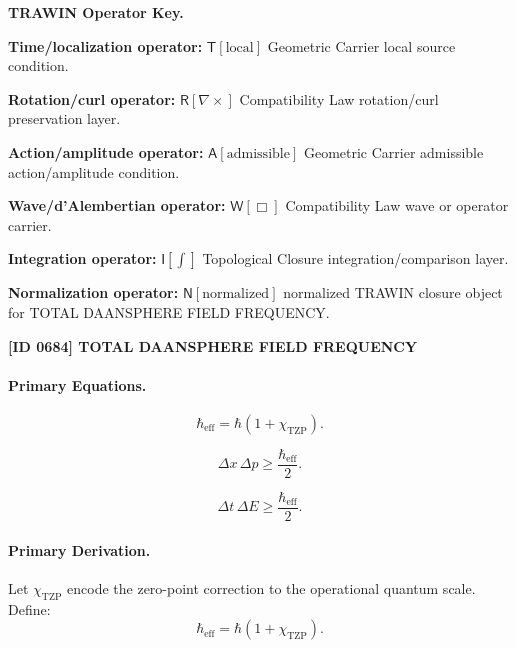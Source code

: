 \par\vspace{0.45\baselineskip}
\noindent\begin{minipage}[t]{\linewidth}
\begingroup
\small
\raggedright
\textbf{TRAWIN Operator Key.}\par
\noindent\textbf{Time/localization operator:} $\mathsf{T}\!\left[\mathrm{local}\right]$ Geometric Carrier local source condition.\par
\noindent\textbf{Rotation/curl operator:} $\mathsf{R}\!\left[\nabla\times\right]$ Compatibility Law rotation/curl preservation layer.\par
\noindent\textbf{Action/amplitude operator:} $\mathsf{A}\!\left[\mathrm{admissible}\right]$ Geometric Carrier admissible action/amplitude condition.\par
\noindent\textbf{Wave/d'Alembertian operator:} $\mathsf{W}\!\left[\Box\right]$ Compatibility Law wave or operator carrier.\par
\noindent\textbf{Integration operator:} $\mathsf{I}\!\left[\int\right]$ Topological Closure integration/comparison layer.\par
\noindent\textbf{Normalization operator:} $\mathsf{N}\!\left[\mathrm{normalized}\right]$ normalized TRAWIN closure object for TOTAL DAANSPHERE FIELD FREQUENCY.\par
\endgroup
\end{minipage}

\clearpage
\noindent\textbf{[ID 0684] TOTAL DAANSPHERE FIELD FREQUENCY}\par
\vspace{0.35em}
\paragraph{Primary Equations.}
\begin{equation}
\hbar_{\mathrm{eff}}
=
\hbar(1+\chi_{\mathrm{TZP}}).
\end{equation}

\begin{equation}
\Delta x\,\Delta p
\geq
\frac{\hbar_{\mathrm{eff}}}{2}.
\end{equation}

\begin{equation}
\Delta t\,\Delta E
\geq
\frac{\hbar_{\mathrm{eff}}}{2}.
\end{equation}

\paragraph{Primary Derivation.}
Let $\chi_{\mathrm{TZP}}$ encode the zero-point correction to the operational quantum scale.  
Define:
\begin{equation}
\hbar_{\mathrm{eff}}
=
\hbar(1+\chi_{\mathrm{TZP}}).
\end{equation}

